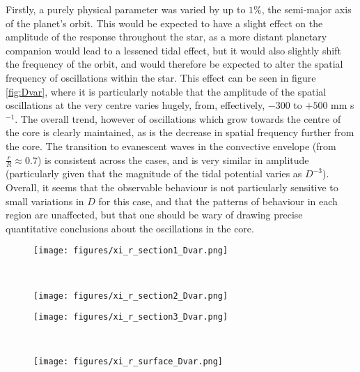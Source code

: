 \documentclass[11pt]{amsart}
\begin{document}
Firstly, a purely physical parameter was varied by up to $1 \%$, the semi-major axis of the planet's orbit.  This would be expected to have a slight effect on the amplitude of the response throughout the star, as a more distant planetary companion would lead to a lessened tidal effect, but it would also slightly shift the frequency of the orbit, and would therefore be expected to alter the spatial frequency of oscillations within the star.  This effect can be seen in figure \ref{fig:Dvar}, where it is particularly notable that the amplitude of the spatial oscillations at the very centre varies hugely, from, effectively, $-300$ to $+500$ mm s$^{-1}$.  The overall trend, however of oscillations which grow towards the centre of the core is clearly maintained, as is the decrease in spatial frequency further from the core.  The transition to evanescent waves in the convective envelope (from $\frac{r}{R} \approx 0.7$) is consistent across the cases, and is very similar in amplitude (particularly given that the magnitude of the tidal potential varies as $D^{-3}$).  Overall, it seems that the observable behaviour is not particularly sensitive to small variations in $D$ for this case, and that the patterns of behaviour in each region are unaffected, but that one should be wary of drawing precise quantitative conclusions about the oscillations in the core.





\begin{sidewaysfigure}[htbp]
\begin{center}
\begin{subfigure}{0.5\textwidth}
\texttt{[image: figures/xi\_r\_section1\_Dvar.png]}
\end{subfigure}
~
\begin{subfigure}{0.5\textwidth}
\texttt{[image: figures/xi\_r\_section2\_Dvar.png]}
\end{subfigure}

\begin{subfigure}{0.5\textwidth}
\texttt{[image: figures/xi\_r\_section3\_Dvar.png]}
\end{subfigure}
~
\begin{subfigure}{0.5\textwidth}
\texttt{[image: figures/xi\_r\_surface\_Dvar.png]}
\end{subfigure}

\caption{The full solution for the non-adiabatic case, showing the peak radial velocity (that is, $m \omega \xi_{r}$) in units of $\frac{m_{p}}{m_{p} + M_{*}}$ m s$^{-1}$, against the proportional radial distance from the centre.  In these figures, the semi-major axis of the planetary companion's orbit has been varied slightly, leading to a small spread in both the amplitudes and spatial frequencies of the oscillations.}
\label{fig:Dvar}
\end{center}
\end{sidewaysfigure}
\end{document}
